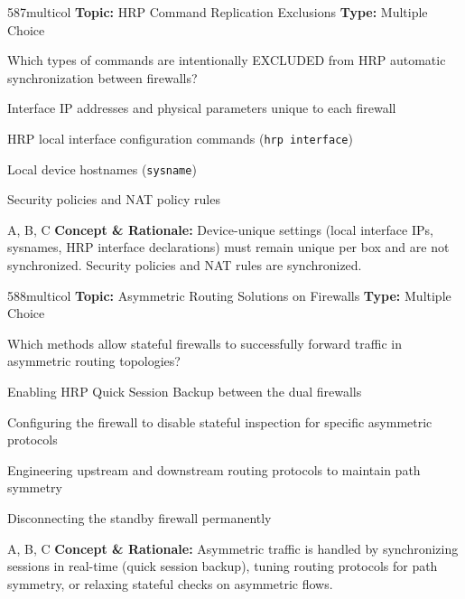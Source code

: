 \begin{qcard}{587}{multicol}
\textcolor{darkslate!75}{\small\textbf{Topic:} HRP Command Replication Exclusions \hfill \textbf{Type:} Multiple Choice}\vspace{0.4em}\par
Which types of commands are intentionally EXCLUDED from HRP automatic synchronization between firewalls?
\begin{qoptions}
\item Interface IP addresses and physical parameters unique to each firewall
\item HRP local interface configuration commands (\texttt{hrp interface})
\item Local device hostnames (\texttt{sysname})
\item Security policies and NAT policy rules
\end{qoptions}
\end{qcard}
\nopagebreak
\begin{explainbox}{A, B, C}
\textbf{Concept \& Rationale:} Device-unique settings (local interface IPs, sysnames, HRP interface declarations) must remain unique per box and are not synchronized. Security policies and NAT rules are synchronized.
\end{explainbox}

\begin{qcard}{588}{multicol}
\textcolor{darkslate!75}{\small\textbf{Topic:} Asymmetric Routing Solutions on Firewalls \hfill \textbf{Type:} Multiple Choice}\vspace{0.4em}\par
Which methods allow stateful firewalls to successfully forward traffic in asymmetric routing topologies?
\begin{qoptions}
\item Enabling HRP Quick Session Backup between the dual firewalls
\item Configuring the firewall to disable stateful inspection for specific asymmetric protocols
\item Engineering upstream and downstream routing protocols to maintain path symmetry
\item Disconnecting the standby firewall permanently
\end{qoptions}
\end{qcard}
\nopagebreak
\begin{explainbox}{A, B, C}
\textbf{Concept \& Rationale:} Asymmetric traffic is handled by synchronizing sessions in real-time (quick session backup), tuning routing protocols for path symmetry, or relaxing stateful checks on asymmetric flows.
\end{explainbox}

